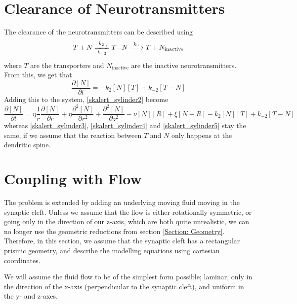 \documentclass{article}
\begin{document}
\section{Clearance of Neurotransmitters}
The clearance of the neurotransmitters can be described using
\begin{equation*}
\ce{$T$ + $N$ <=>[$k_2$][$k_{-2}$] $T-N$ ->[$k_3$] $T$ + $N_{\text{inactive}}$}
\end{equation*}
where $T$ are the transporters and $N_{\text{inactive}}$ are the inactive neurotransmitters. From this, we get that
\begin{equation*}
    \frac{\partial [N]}{\partial t} = - k_2 [N][T] + k_{-2} [T-N]
\end{equation*}
Adding this to the system, \eqref{skalert_sylinder2} become
\begin{equation}
    \frac{\partial [N]}{\partial t} = 
    \eta \frac{1}{r} \frac{\partial [N]}{\partial r} +\eta  \frac{\partial^2 [N]}{\partial r^2}  +  \frac{\partial^2 [N]}{\partial z^2} -  \nu [N] [R] +  \xi [N-R] - k_2 [N][T] + k_{-2} [T-N]
\end{equation}
whereas \eqref{skalert_sylinder3}, \eqref{skalert_sylinder4} and \eqref{skalert_sylinder5} stay the same, if we assume that the reaction between $T$ and $N$ only happens at the dendritic spine.

\section{Coupling with Flow}
The problem is extended by adding an underlying moving fluid moving in the synaptic cleft. Unless we assume that the flow is either rotationally symmetric, or going only in the direction of our z-axis, which are both quite unrealistic, we can no longer use the geometric reductions from section \ref{Section: Geometry}. Therefore, in this section, we assume that the synaptic cleft has a rectangular prismic geometry, and describe the modelling equations using cartesian coordinates.

We will assume the fluid flow to be of the simplest form possible; laminar, only in the direction of the x-axis (perpendicular to the synaptic cleft), and uniform in the y- and z-axes.
\end{document}
